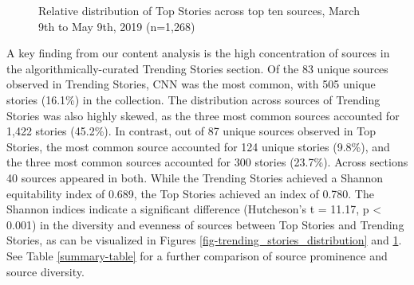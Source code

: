 \begin{figure}[!t]
\begin{center}
\end{center}
\caption{Relative distribution of Top Stories across top ten sources, March 9th to May 9th, 2019 (n=1,268)}\label{fig-top_stories_distribution}
\end{figure}

A key finding from our content analysis is the high concentration of sources in the algorithmically-curated Trending Stories section. Of the 83 unique sources observed in Trending Stories, CNN was the most common, with 505 unique stories (16.1\%) in the collection. The distribution across sources of Trending Stories was also highly skewed, as the three most common sources accounted for 1,422 stories (45.2\%). In contrast, out of 87 unique sources observed in Top Stories, the most common source accounted for 124 unique stories (9.8\%), and the three most common sources accounted for 300 stories (23.7\%). Across sections 40 sources appeared in both. While the Trending Stories achieved a Shannon equitability index of 0.689, the Top Stories achieved an index of 0.780. The Shannon indices indicate a significant difference (Hutcheson's t = 11.17, p < 0.001) in the diversity and evenness of sources between Top Stories and Trending Stories, as can be visualized in Figures \ref{fig-trending_stories_distribution} and \ref{fig-top_stories_distribution}. See Table \ref{summary-table} for a further comparison of source prominence and source diversity. 




